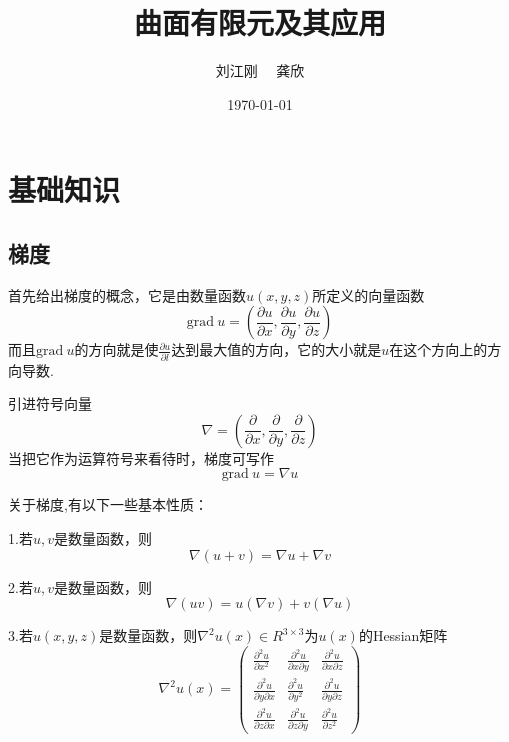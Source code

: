 \documentclass{article}
\begin{document}
\title{曲面有限元及其应用}
\author{刘江刚 \ \ 龚欣}
\date{\today}
\maketitle
\newpage
\section{基础知识}
\subsection{梯度}
首先给出梯度的概念，它是由数量函数$u(x,y,z)$所定义的向量函数
\begin{equation*}
\text{grad}~u=\left(\frac{\partial u}{\partial x},\frac{\partial u}{\partial y},\frac{\partial u}{\partial z}\right) 
\end{equation*}
而且$\text{grad}~u$的方向就是使$\frac{\partial u}{\partial l}$达到最大值的方向，它的大小就是$u$在这个方向上的方向导数.

引进符号向量
\begin{equation*}
\nabla=\left(\frac{\partial}{\partial x},\frac{\partial}{\partial y},\frac{\partial}{\partial z}\right)
\end{equation*}
当把它作为运算符号来看待时，梯度可写作
\begin{equation*}
\text{grad}~u=\nabla u
\end{equation*}

关于梯度,有以下一些基本性质：

1.若$u,v$是数量函数，则
\begin{equation*}
\nabla(u+v)=\nabla u+\nabla v
\end{equation*}

2.若$u,v$是数量函数，则
\begin{equation*}
\nabla(uv)=u(\nabla v)+v(\nabla u)
\end{equation*}

3.若$u(x,y,z)$是数量函数，则$\nabla^2u(x)\in R^{3\times 3}$为$u(x)$的Hessian矩阵
\begin{equation*}
\nabla^2u(x)=
\begin{pmatrix}
\frac{\partial^2u}{\partial x^2} & \frac{\partial^2u}{\partial x\partial y} & \frac{\partial^2u}{\partial x\partial z} \\
\frac{\partial^2u}{\partial y\partial x} & \frac{\partial^2u}{\partial y^2} & \frac{\partial^2u}{\partial y\partial z} \\
\frac{\partial^2u}{\partial z\partial x} & \frac{\partial^2u}{\partial z\partial y} & \frac{\partial^2u}{\partial z^2} 
\end{pmatrix}
\end{equation*}
\end{document}
